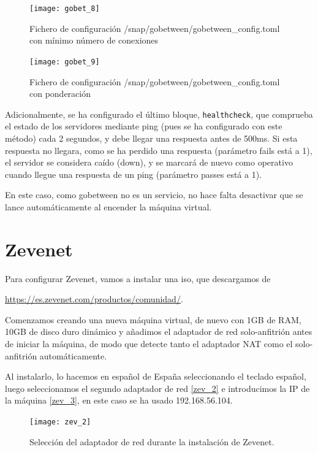 \begin{figure}[h!]
\begin{center}
\caption{Fichero de configuración /snap/gobetween/gobetween\_config.toml con mínimo número de conexiones}
\label{gobet_8}
\texttt{[image: gobet\_8]}
\end{center}
\end{figure}

\begin{figure}[h!]
\begin{center}
\caption{Fichero de configuración /snap/gobetween/gobetween\_config.toml con ponderación}
\label{gobet_9}
\texttt{[image: gobet\_9]}
\end{center}
\end{figure}

Adicionalmente, se ha configurado el último bloque, \verb|healthcheck|, que comprueba el estado de los servidores mediante ping (pues se ha configurado con este método) cada 2 segundos, y debe llegar una respuesta antes de 500ms. Si esta respuesta no llegara, como se ha perdido una respuesta (parámetro fails está a 1), el servidor se considera caído (down), y se marcará de nuevo como operativo cuando llegue una respuesta de un ping (parámetro passes está a 1).

En este caso, como gobetween no es un servicio, no hace falta desactivar que se lance automáticamente al encender la máquina virtual.

\chapter{Zevenet}

Para configurar Zevenet, vamos a instalar una iso, que descargamos de

\href{https://es.zevenet.com/productos/comunidad/}{https://es.zevenet.com/productos/comunidad/}.

Comenzamos creando una nueva máquina virtual, de nuevo con 1GB de RAM, 10GB de disco duro dinámico y añadimos el adaptador de red solo-anfitrión antes de iniciar la máquina, de modo que detecte tanto el adaptador NAT como el solo-anfitrión automáticamente.

Al instalarlo, lo hacemos en español de España seleccionando el teclado español, luego seleccionamos el segundo adaptador de red \eqref{zev_2} e introducimos la IP de la máquina \eqref{zev_3}, en este caso se ha usado 192.168.56.104.

\begin{figure}[h!]
\begin{center}
\caption{Selección del adaptador de red durante la instalación de Zevenet.}
\label{zev_2}
\texttt{[image: zev\_2]}
\end{center}
\end{figure}

